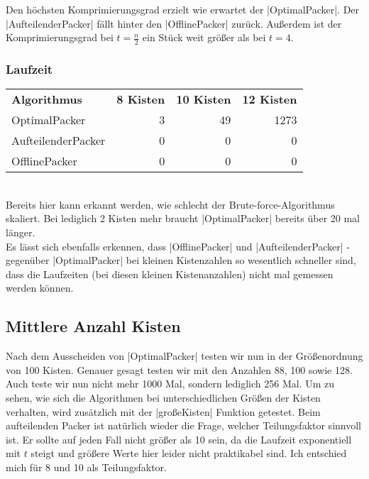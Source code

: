  Den höchsten Komprimierungsgrad erzielt wie erwartet der |OptimalPacker|.
 Der |AufteilenderPacker| fällt hinter den |OfflinePacker| zurück.
 Außerdem ist der Komprimierungsgrad bei $t=\frac{n}{2}$ ein Stück weit größer als bei $t=4$.

\subsubsection*{Laufzeit}
\begin{tabular}{lrrr}
\textbf{Algorithmus} 	& \textbf{8 Kisten} 	& \textbf{10 Kisten} 	& \textbf{12 Kisten} 	\\
 OptimalPacker       	& 3               	& 49              	& 1273               	\\
 AufteilenderPacker  	& 0		 	& 0			& 0			\\
 OfflinePacker		& 0			& 0			& 0			\\
\end{tabular}\\

 Bereits hier kann erkannt werden, wie schlecht der Brute-force-Algorithmus skaliert.
 Bei lediglich 2 Kisten mehr braucht |OptimalPacker| bereits über 20 mal länger. \\
 Es lässt sich ebenfalls erkennen, dass |OfflinePacker| und |AufteilenderPacker| - gegenüber |OptimalPacker|
  bei kleinen Kistenzahlen so wesentlich schneller sind, dass die Laufzeiten (bei diesen kleinen Kistenanzahlen) nicht mal gemessen werden können.

\subsection{Mittlere Anzahl Kisten}
 Nach dem Ausscheiden von |OptimalPacker| testen wir nun in der Größenordnung von 100 Kisten.
 Genauer gesagt testen wir mit den Anzahlen 88, 100 sowie 128.
 Auch teste wir nun nicht mehr 1000 Mal, sondern lediglich 256 Mal.
 Um zu sehen, wie sich die Algorithmen bei unterschiedlichen Größen der Kisten verhalten, wird zusätzlich mit der |großeKisten| Funktion getestet.
 Beim aufteilenden Packer ist natürlich wieder die Frage, welcher Teilungsfaktor sinnvoll ist.
 Er sollte auf jeden Fall nicht größer als 10 sein, da die Laufzeit exponentiell mit $t$ steigt und größere Werte hier leider nicht praktikabel sind.
 Ich entschied mich für 8 und 10 als Teilungsfaktor.

